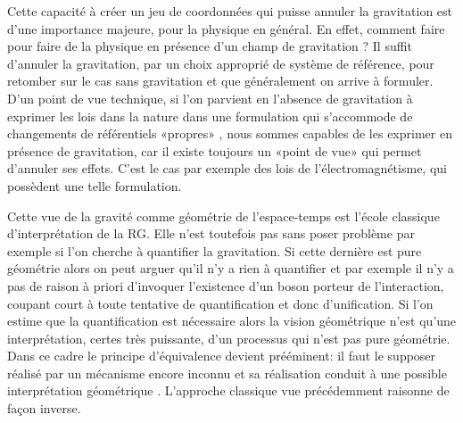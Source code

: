 Cette capacité à créer un jeu de coordonnées qui puisse annuler la gravitation est d'une importance majeure, pour la physique en général. En effet, comment faire pour faire de la physique en présence d'un champ de gravitation ? Il suffit d'annuler la gravitation, par un choix approprié de système de référence, pour retomber sur le cas sans gravitation et que généralement on arrive à formuler. D'un point de vue technique, si l'on parvient en l'absence de gravitation à exprimer les lois dans la nature dans une formulation qui s'accommode de changements de référentiels «propres» , nous sommes capables de les exprimer en présence de gravitation, car il existe toujours un «point de vue» qui permet d'annuler ses effets. C'est le cas par exemple des lois de l'électromagnétisme, qui possèdent une telle formulation.

Cette vue de la gravité comme géométrie de l'espace-temps est l'école classique d'interprétation de la RG. Elle n'est toutefois pas sans poser problème par exemple si l'on cherche à quantifier la gravitation. Si cette dernière est pure géométrie alors on peut arguer qu'il n'y a rien à quantifier et par exemple il n'y a pas de raison à priori d'invoquer l'existence d'un boson porteur de l'interaction, coupant court à toute tentative de quantification et donc d'unification. Si l'on estime que la quantification est nécessaire alors la vision géométrique n'est qu'une interprétation, certes très puissante, d'un processus qui n'est pas pure géométrie. Dans ce cadre le principe d'équivalence devient prééminent: il faut le supposer réalisé par un mécanisme encore inconnu et sa réalisation conduit à une possible interprétation géométrique . L'approche classique vue précédemment raisonne de façon inverse.


